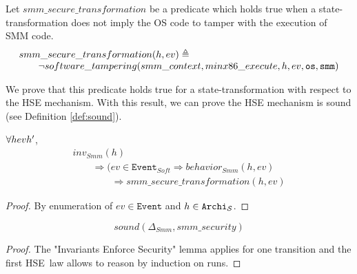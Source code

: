                                        Let $smm\_secure\_transformation$ be a
                                       predicate which holds true when a
                                       state-transformation does not imply the
                                       OS code to tamper with the execution of
                                       SMM code.
                                       \[ \begin{array}{l}
                                            smm\_secure\_transformation(h, ev) \triangleq \\
                                            \qquad \neg
                                            software\_tampering(smm\_context,
                                            minx86\_execute, h, ev, \mathtt{os},
                                            \mathtt{smm})
                                          \end{array} \]

                                        We prove that this predicate holds true
                                        for a state-transformation with respect
                                        to the HSE mechanism. With this result,
                                        we can prove the HSE mechanism is sound
                                        (see Definition \ref{def:sound}).

\begin{lemma}
  $\forall \transitionLTS{Smmx86}{h}{ev}{h'}$,
  \[ \begin{array}{l}
       inv_{Smm}(h) \\
       \qquad \Rightarrow (ev \in \texttt{Event}_{Soft} \Rightarrow
       behavior_{Smm}(h,ev) \\
       \qquad\qquad \Rightarrow smm\_secure\_transformation(h, ev)
     \end{array} \]
 \end{lemma}

\begin{proof}
  By enumeration of $ev \in \texttt{Event}$ and
  $h \in \texttt{Archi}_{\mathcal{S}}$.
\end{proof}

\begin{theorem}
  \[ sound(\Delta_{Smm}, smm\_security) \]
\end{theorem}

\begin{proof}
  The "Invariants Enforce Security" lemma applies for one transition and the
  first HSE law allows to reason by induction on runs.
\end{proof}

